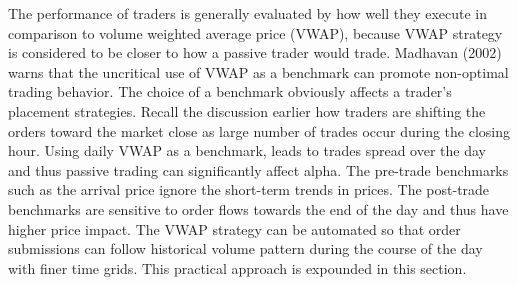 The performance of traders is generally evaluated by how well they execute in comparison to volume weighted average price (VWAP), because VWAP strategy is considered to be closer to how a passive trader would trade. Madhavan (2002)~\cite{mad_a02} warns that the uncritical use of VWAP as a benchmark can promote non-optimal trading behavior. The choice of a benchmark obviously affects a trader's placement strategies. Recall the discussion earlier how traders are shifting the orders toward the market close as large number of trades occur during the closing hour. Using daily VWAP as a benchmark, leads to trades spread over the day and thus passive trading can significantly affect alpha. The pre-trade benchmarks such as the arrival price ignore the short-term trends in prices. The post-trade benchmarks are sensitive to order flows towards the end of the day and thus have higher price impact. The VWAP strategy can be automated so that order submissions can follow historical volume pattern during the course of the day with finer time grids. This practical approach is expounded in this section.


